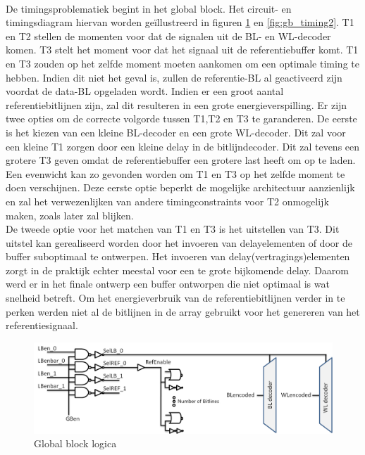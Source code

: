 \paragraph{}
De timingsproblematiek begint in het global block. Het circuit- en timingsdiagram hiervan worden geïllustreerd in figuren \ref{fig:gb_timing1} en \ref{fig:gb_timing2}. T1 en T2 stellen de momenten voor dat de signalen uit de BL- en WL-decoder komen. T3 stelt het moment voor dat het signaal uit de referentiebuffer komt. T1 en T3 zouden op het zelfde moment moeten aankomen om een optimale timing te hebben. Indien dit niet het geval is, zullen de referentie-BL al geactiveerd zijn voordat de data-BL opgeladen wordt. Indien er een groot aantal referentiebitlijnen zijn, zal dit resulteren in een grote energieverspilling. Er zijn twee opties om de correcte volgorde tussen T1,T2 en T3 te garanderen. De eerste is het kiezen van een kleine BL-decoder en een grote WL-decoder. Dit zal voor een kleine T1 zorgen door een kleine delay in de bitlijndecoder. Dit zal tevens een grotere T3 geven omdat de referentiebuffer een grotere last heeft om op te laden. Een evenwicht kan zo gevonden worden om T1 en T3 op het zelfde moment te doen verschijnen. Deze eerste optie beperkt de mogelijke architectuur aanzienlijk en zal het verwezenlijken van andere timingconstraints voor T2 onmogelijk maken, zoals later zal blijken.\\ 
De tweede optie voor het matchen van T1 en T3 is het uitstellen van T3. Dit uitstel kan gerealiseerd worden door het invoeren van delayelementen of door de buffer suboptimaal te ontwerpen. Het invoeren van delay(vertragings)elementen zorgt in de praktijk echter meestal voor een te grote bijkomende delay. Daarom werd er in het finale ontwerp een buffer ontworpen die niet optimaal is wat snelheid betreft. Om het energieverbruik van de referentiebitlijnen verder in te perken werden niet al de bitlijnen in de array gebruikt voor het genereren van het referentiesignaal.

\begin{figure}[!ht]
  \centering
  \includegraphics[scale=0.6]{../fig/hfdstk-timing-gb1.png}
  \caption[Global block:logica]{Global block logica}
  \label{fig:gb_timing1}
\end{figure}

